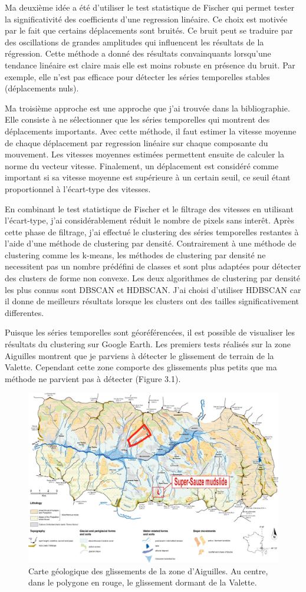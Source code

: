 \documentclass[11pt, openany]{report}
\begin{document}
Ma deuxième idée a été d'utiliser le test statistique de Fischer qui permet tester la significativité des coefficients d'une regression linéaire. Ce choix est motivée par le fait que certains déplacements sont bruités. Ce bruit peut se traduire par des oscillations de grandes amplitudes qui influencent les résultats de la régression. Cette méthode a donné des résultats convainquants lorsqu'une tendance linéaire est claire mais elle est moins robuste en présence du bruit. Par exemple, elle n'est pas efficace pour détecter les séries temporelles stables (déplacements nuls).

Ma troisième approche est une approche que j'ai trouvée dans la bibliographie. Elle consiste à ne sélectionner que les séries temporelles qui montrent des déplacements 
importants. Avec cette méthode, il faut estimer la vitesse moyenne de chaque déplacement par regression linéaire sur chaque composante du mouvement. Les vitesses moyennes estimées permettent ensuite de calculer la norme du vecteur vitesse. Finalement, un déplacement est considéré comme important si sa vitesse moyenne est supérieure à un certain seuil, ce  seuil étant proportionnel à l'écart-type des vitesses.

En combinant le test statistique de Fischer et le filtrage des vitesses en utilisant l'écart-type, j'ai considérablement réduit le nombre de pixels sans interêt. Après cette phase de filtrage, j'ai effectué le clustering des séries temporelles restantes à l'aide d'une méthode de clustering par densité. Contrairement à une méthode de clustering comme les k-means, les méthodes de clustering par densité ne necessitent pas un nombre prédéfini de classes et sont plus adaptées pour détecter des clusters de forme non convexe. Les deux algorithmes de clustering par densité les plus connus sont DBSCAN et HDBSCAN. J'ai choisi d'utiliser HDBSCAN car il donne de meilleurs résultats lorsque les clusters ont des tailles significativement differentes.

Puisque les séries temporelles sont géoréférencées, il est possible de visualiser les résultats du clustering sur Google Earth. Les premiers tests réalisés sur la zone Aiguilles montrent que je parviens à détecter le glissement de terrain de la Valette. Cependant cette zone comporte des glissements plus petits que ma méthode ne parvient pas à détecter (Figure 3.1).

\begin{figure}[H]
  \centering
  \includegraphics[width=0.6\linewidth]{carte_lavalette.png}
  \caption{Carte géologique des glissements de la zone d'Aiguilles. Au centre, dans le polygone en rouge, le glissement dormant de la Valette.}
\end{figure}
\end{document}
